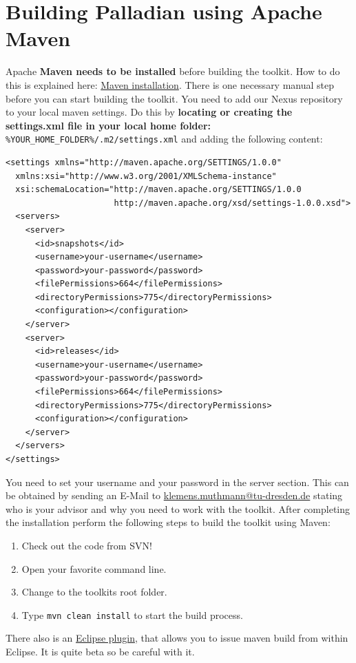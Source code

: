 \documentclass[a4paper,twoside]{book}      %
\begin{document}
\section{Building Palladian using Apache Maven}
\label{sec:buildingthetoolkitusingapachemaven}
Apache \textbf{Maven needs to be installed} before building the toolkit. How to do this is explained here: \href{http://maven.apache.org/download.html#Installation}{Maven installation}. There is one necessary manual step before you can start building the toolkit. You need to add our Nexus repository to your local maven settings. Do this by \textbf{locating or creating the settings.xml file in your local home folder:} \texttt{\%YOUR\_HOME\_FOLDER\%/.m2/settings.xml} and adding the following content:
\begin{verbatim}
<settings xmlns="http://maven.apache.org/SETTINGS/1.0.0"
  xmlns:xsi="http://www.w3.org/2001/XMLSchema-instance"
  xsi:schemaLocation="http://maven.apache.org/SETTINGS/1.0.0
                      http://maven.apache.org/xsd/settings-1.0.0.xsd">
  <servers>
    <server>
      <id>snapshots</id>
      <username>your-username</username>
      <password>your-password</password>
      <filePermissions>664</filePermissions>
      <directoryPermissions>775</directoryPermissions>
      <configuration></configuration>
    </server>
    <server>
      <id>releases</id>
      <username>your-username</username>
      <password>your-password</password>
      <filePermissions>664</filePermissions>
      <directoryPermissions>775</directoryPermissions>
      <configuration></configuration>
    </server>
  </servers>
</settings>
\end{verbatim}
You need to set your username and your password in the server section. This can be obtained by sending an E-Mail to \href{mailto:klemens.muthmann@tu-dresden.de}{klemens.muthmann@tu-dresden.de} stating who is your advisor and why you need to work with the toolkit. After completing the installation perform the following steps to build the toolkit using Maven:
\begin{enumerate}
\item Check out the code from SVN!
\item Open your favorite command line.
\item Change to the toolkits root folder.
\item Type \texttt{mvn clean install} to start the build process.
\end{enumerate}
There also is an \href{http://m2eclipse.sonatype.org/}{Eclipse plugin}, that allows you to issue maven build from within Eclipse. It is quite beta so be careful with it.
\end{document}
